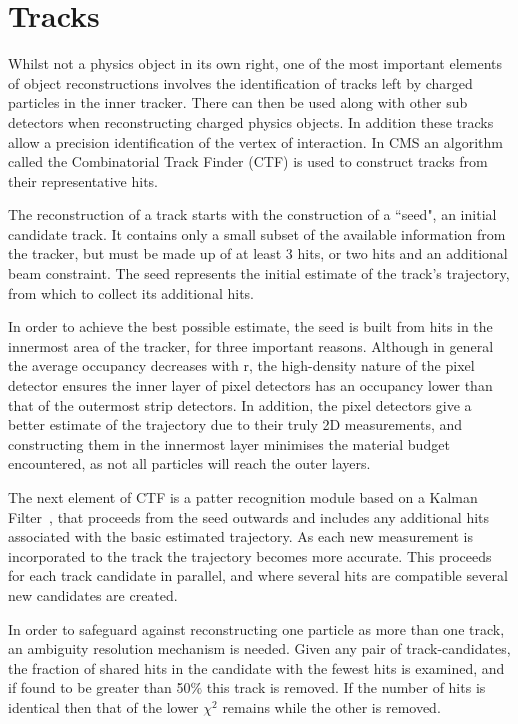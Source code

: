  
\section{Tracks}
\label{sec:trk}

Whilst not a physics object in its own right, one of the most important elements of object reconstructions involves the identification of tracks left by charged particles in the inner tracker. There can then be used along with other sub detectors when reconstructing charged physics objects. In addition these tracks allow a precision identification of the vertex of interaction. In CMS an algorithm called the Combinatorial Track Finder (CTF) is used to construct tracks from their representative hits. 

The reconstruction of a track starts with the construction of a ``seed", an initial candidate track. It contains only a small subset of the available information from the tracker, but must be made up of at least 3 hits, or two hits and an additional beam constraint. The seed represents the initial estimate of the track's trajectory, from which to collect its additional hits. 

In order to achieve the best possible estimate, the seed is built from hits in the innermost area of the tracker, for three important reasons. Although in general the average occupancy decreases with r, the high-density nature of the pixel detector ensures the inner layer of pixel detectors has an occupancy lower than that of the outermost strip detectors. In addition, the pixel detectors give a better estimate of the trajectory due to their truly 2D measurements, and constructing them in the innermost layer minimises the material budget encountered, as not all particles will reach the outer layers. 

The next element of CTF is a patter recognition module based on a Kalman Filter~\cite{Kalman}, that proceeds from the seed outwards and includes any additional hits associated with the basic estimated trajectory. As each new measurement is incorporated to the track the trajectory becomes more accurate. This proceeds for each track candidate in parallel, and where several hits are compatible several new candidates are created. 

In order to safeguard against reconstructing one particle as more than one track, an ambiguity resolution mechanism is needed. Given any pair of track-candidates, the fraction of shared hits in the candidate with the fewest hits is examined, and if found to be greater than 50$\%$ this track is removed. If the number of hits is identical then that of the lower $\chi^{2}$ remains while the other is removed. 

